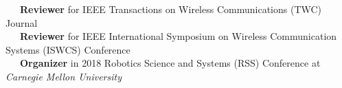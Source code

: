 

\bullet~~~\textbf{Reviewer} for IEEE Transactions on Wireless Communications (TWC) Journal\\
\bullet~~~\textbf{Reviewer} for IEEE International Symposium on Wireless Communication Systems (ISWCS) Conference\\
\bullet~~~\textbf{Organizer} in 2018 Robotics Science and Systems (RSS) Conference at \textit{Carnegie Mellon University}\\

\vspace{0.01cm}